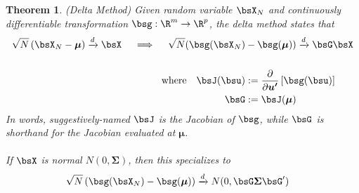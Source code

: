 \documentclass[12pt]{article}
\theoremstyle{plain}
\newtheorem{thm}{Theorem}[section]
\theoremstyle{definition}
\theoremstyle{remark}
\newcommand{\bsmu}{\boldsymbol{\mu}}
\newcommand{\bsSigma}{\boldsymbol{\Sigma}}
\newcommand{\bsup}{\boldsymbol{u'}}
\newcommand{\dto}{\xrightarrow{d}}
\begin{document}
\begin{thm}\emph{(Delta Method)}
Given random variable $\bsX_N$ and continuously differentiable
transformation $\bsg:\R^m\rightarrow \R^p$, the \emph{delta method}
states that
\begin{align*}
  \sqrt{N}\left(
  \bsX_N
  -\bsmu
  \right)
  \dto \bsX
  \quad\implies\quad
  \sqrt{N}(
  \bsg(\bsX_N)
  &-
  \bsg(\bsmu)
  )
  \dto
  \bsG \bsX
  \\\\
  \text{where}\quad
  \bsJ(\bsu)
  &:=\frac{\partial}{\partial \bsup}
  \left[\bsg(\bsu)\right]\\
  \bsG &:= \bsJ(\bsmu)
\end{align*}
In words, suggestively-named $\bsJ$ is the Jacobian of $\bsg$, while
$\bsG$ is shorthand for the Jacobian evaluated at $\bsmu$.
\\
\\
If $\bsX$ is normal $N(0,\bsSigma)$, then this specializes to
\begin{align*}
  \sqrt{N}\left(
  \bsg(\bsX_N)
  -
  \bsg(\bsmu)
  \right)
  &\dto
  N(0,\bsG\bsSigma\bsG')
\end{align*}
\end{thm}
\end{document}
